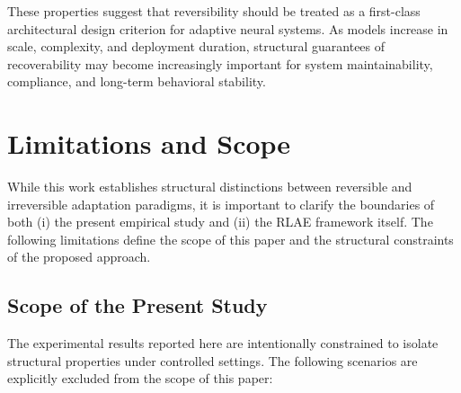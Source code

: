 \documentclass[10pt]{article}
\begin{document}
	These properties suggest that reversibility should be treated as a first-class architectural design criterion for adaptive neural systems. As models increase in scale, complexity, and deployment duration, structural guarantees of recoverability may become increasingly important for system maintainability, compliance, and long-term behavioral stability.
	
	\section{Limitations and Scope}
	\label{sec:rlaelimitsandscope}
	
	While this work establishes structural distinctions between reversible and irreversible adaptation paradigms, it is important to clarify the boundaries of both (i) the present empirical study and (ii) the RLAE framework itself. The following limitations define the scope of this paper and the structural constraints of the proposed approach.
	
	\subsection{Scope of the Present Study}
	
	The experimental results reported here are intentionally constrained to isolate structural properties under controlled settings. The following scenarios are explicitly excluded from the scope of this paper:
	
\end{document}
